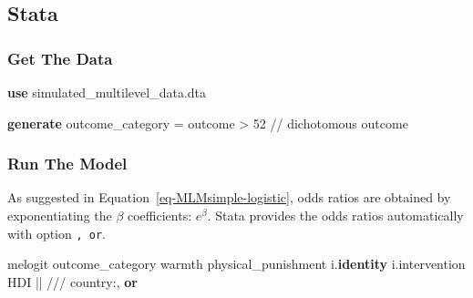 \documentclass[
  letterpaper,
  DIV=11,
  numbers=noendperiod]{scrreprt}
\newenvironment{Shaded}{\begin{snugshade}}{\end{snugshade}}
\newcommand{\CommentTok}[1]{\textcolor[rgb]{0.37,0.37,0.37}{#1}}
\newcommand{\KeywordTok}[1]{\textcolor[rgb]{0.00,0.23,0.31}{\textbf{#1}}}
\newcommand{\NormalTok}[1]{\textcolor[rgb]{0.00,0.23,0.31}{#1}}
\begin{document}
\subsection{Stata}

\subsubsection{Get The Data}\label{get-the-data-6}

\begin{Shaded}
\begin{Highlighting}[]

\KeywordTok{use}\NormalTok{ simulated\_multilevel\_data.dta}

\KeywordTok{generate}\NormalTok{ outcome\_category = outcome \textgreater{} 52 }\CommentTok{// dichotomous outcome}
\end{Highlighting}
\end{Shaded}

\subsubsection{Run The Model}\label{run-the-model-3}

As suggested in Equation~\ref{eq-MLMsimple-logistic}, odds ratios are
obtained by exponentiating the \(\beta\) coefficients: \(e^{\beta}\).
Stata provides the odds ratios automatically with option \texttt{,\ or}.

\begin{Shaded}
\begin{Highlighting}[]
\NormalTok{melogit outcome\_category warmth physical\_punishment i.}\KeywordTok{identity}\NormalTok{ i.intervention HDI || }\CommentTok{/// }
\NormalTok{country:, }\KeywordTok{or}
\end{Highlighting}
\end{Shaded}
\end{document}
